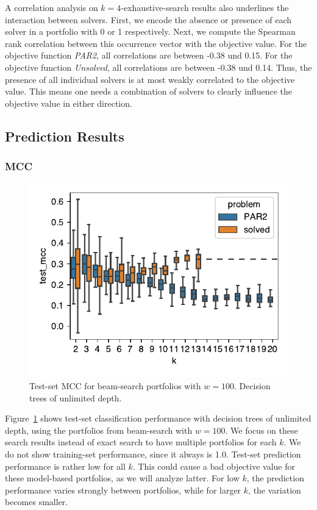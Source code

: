 \documentclass[conference]{IEEEtran}
\begin{document}
A correlation analysis on $k=4$-exhaustive-search results also underlines the interaction between solvers.
First, we encode the absence or presence of each solver in a portfolio with 0 or 1 respectively.
Next, we compute the Spearman rank correlation between this occurrence vector with the objective value.
For the objective function \emph{PAR2}, all correlations are between -0.38 und 0.15.
For the objective function \emph{Unsolved}, all correlations are between -0.38 und 0.14.
Thus, the presence of all individual solvers is at most weakly correlated to the objective value.
This means one needs a combination of solvers to clearly influence the objective value in either direction.

\subsection{Prediction Results}

\subsubsection{MCC}

\begin{figure}[t]
	\centering
	\includegraphics[width=\columnwidth]{plots/mcc.pdf}
	\caption{Test-set MCC for beam-search portfolios with $w=100$. Decision trees of unlimited depth.}
	\label{fig:mcc}
\end{figure}

Figure~\ref{fig:mcc} shows test-set classification performance with decision trees of unlimited depth, using the portfolios from beam-search with $w=100$.
We focus on these search results instead of exact search to have multiple portfolios for each $k$.
We do not show training-set performance, since it always is 1.0.
Test-set prediction performance is rather low for all $k$.
This could cause a bad objective value for these model-based portfolios, as we will analyze latter.
For low $k$, the prediction performance varies strongly between portfolios, while for larger $k$, the variation becomes smaller.
\end{document}
